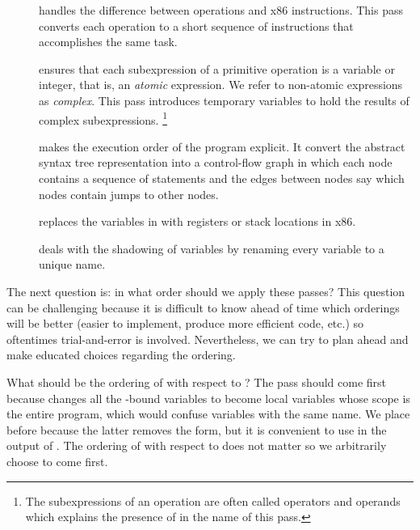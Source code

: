 \documentclass[11pt]{book}
\begin{document}
\begin{description}
\item[] handles the difference between
  \LangVar{} operations and x86 instructions. This pass converts each
  \LangVar{} operation to a short sequence of instructions that
  accomplishes the same task.

\item[] ensures that each subexpression of
  a primitive operation is a variable or integer, that is, an
  \emph{atomic} expression. We refer to non-atomic expressions as
  \emph{complex}.  This pass introduces temporary variables to hold
  the results of complex subexpressions.%
  \footnote{The subexpressions of an operation are often called
    operators and operands which explains the presence of
     in the name of this pass.}
  
\item[] makes the execution order of the
  program explicit. It convert the abstract syntax tree representation
  into a control-flow graph in which each node contains a sequence of
  statements and the edges between nodes say which nodes contain jumps
  to other nodes.

\item[] replaces the variables in \LangVar{} with
  registers or stack locations in x86.

\item[] deals with the shadowing of variables by
  renaming every variable to a unique name.
\end{description}

The next question is: in what order should we apply these passes? This
question can be challenging because it is difficult to know ahead of
time which orderings will be better (easier to implement, produce more
efficient code, etc.) so oftentimes trial-and-error is
involved. Nevertheless, we can try to plan ahead and make educated
choices regarding the ordering.

What should be the ordering of  with respect to
? The  pass should come first because
 changes all the -bound variables to
become local variables whose scope is the entire program, which would
confuse variables with the same name.
%
We place  before 
because the latter removes the  form, but it is convenient to
use  in the output of .
%
The ordering of  with respect to
 does not matter so we arbitrarily choose
 to come first.
\end{document}
